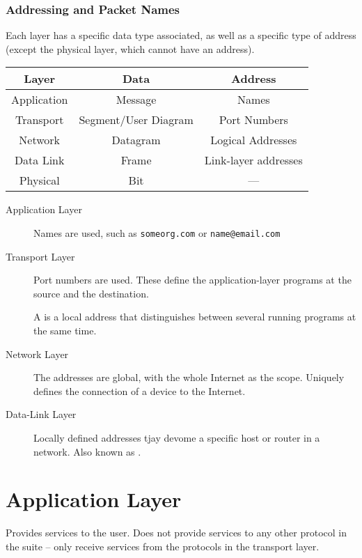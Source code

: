 \documentclass[\main/notes.tex]{subfiles}
\begin{document}
					\pagebreak
					\subsubsection{Addressing and Packet Names}
						Each layer has a specific data type associated, as well as a specific type of address (except the physical layer, which cannot have an address).
						\begin{center}
							\begin{tabular}{ccc}
								Layer & Data & Address\\
								\midrule
								Application & Message & Names\\
								Transport & Segment/User Diagram & Port Numbers\\
								Network & Datagram & Logical Addresses\\
								Data Link & Frame & Link-layer addresses\\
								Physical & Bit & ---
							\end{tabular}
						\end{center}
						\begin{indentparagraph}
							\begin{description}
								\item[Application Layer] Names are used, such as \texttt{someorg.com} or \texttt{name@email.com}
								\item[Transport Layer] Port numbers are used. These define the application-layer programs at the source and the destination.

								A  is a local address that distinguishes between several running programs at the same time.
								\item[Network Layer] The addresses are global, with the whole Internet as the scope. Uniquely defines the connection of a device to the Internet.
								\item[Data-Link Layer] Locally defined addresses tjay devome a specific host or router in a network. Also known as .
							\end{description}
						\end{indentparagraph}

		\section{Application Layer}
			Provides services to the user. Does not provide services to any other protocol in the suite -- only receive services from the protocols in the transport layer.
\end{document}
